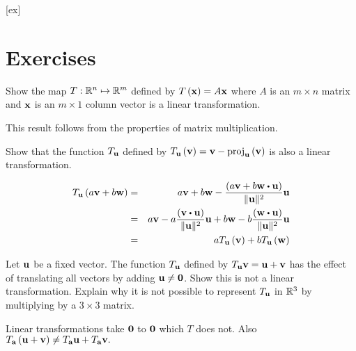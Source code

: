 [ex]
\section*{Exercises}

\begin{enumialphparenastyle}

\begin{ex} Show the map $T:\mathbb{R}^{n}\mapsto \mathbb{R}^{m}$ defined by 
$T\left({\bf x} \right) =A{\bf x}$ where $A$ is an $m\times n$ matrix
and ${\bf x}$ is an $m\times 1$ column vector is a linear transformation. 
\begin{sol}
This result follows from the properties of matrix multiplication.
\end{sol}
\end{ex}

\begin{ex} Show that the function $T_{{\bf u}}$ defined by $T_{{\bf u}}
\left({\bf v}\right) = {\bf v}-\mbox{proj}_{{\bf u}}\left(
{\bf v}\right) $ is also a linear transformation.
\begin{sol}
\begin{eqnarray*}
T_{\vect{u}}\tup{a\vect{v}+b\vect{w}} &=&a\vect{v}+b\vect{w}-\frac{\tup{a\vect{v}+b\vect{w}\dotprod \vect{u}} }{\norm{\vect{u}
} ^{2}}\vect{u} \\
&=&a\vect{v}-a\frac{\tup{\vect{v}\dotprod \vect{u}} }{\norm{\vect{u}} ^{2}}\vect{u}+b\vect{w}-b\frac{\tup{\vect{w}\dotprod \vect{u}
} }{\norm{\vect{u}} ^{2}}\vect{u} \\
&=&aT_{\vect{u}}\tup{\vect{v}} +bT_{\vect{u}}\tup{\vect{w}
}
\end{eqnarray*}
\end{sol}
\end{ex}

\begin{ex} Let ${\bf u}$ be a fixed vector. The function 
$T_{{\bf u}}$ defined by $T_{{\bf u}}{\bf v}={\bf u}+{\bf v}$ has the effect of
translating all vectors by adding ${\bf u}\neq {\bf 0}$. Show this is not a
linear transformation. Explain why it is not possible to represent 
$T_{{\bf u}}$ in $\mathbb{R}^{3}$ by multiplying by a $3\times 3$ matrix.
\begin{sol}
Linear
transformations take ${\bf 0}$ to ${\bf 0}$ which $T$ does not. Also $T_{{\bf a}}\left({\bf u}+{\bf v}\right) \neq T_{{\bf a}}{\bf u}+T_{{\bf a}}
{\bf v}.$
\end{sol}
\end{ex}

\end{enumialphparenastyle}